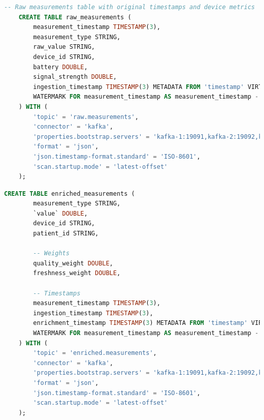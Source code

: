 \begin{lstlisting}[language=sql]
    -- Raw measurements table with original timestamps and device metrics
    CREATE TABLE raw_measurements (
        measurement_timestamp TIMESTAMP(3),
        measurement_type STRING,
        raw_value STRING,
        device_id STRING,
        battery DOUBLE,
        signal_strength DOUBLE,
        ingestion_timestamp TIMESTAMP(3) METADATA FROM 'timestamp' VIRTUAL,
        WATERMARK FOR measurement_timestamp AS measurement_timestamp - INTERVAL '10' SECONDS
    ) WITH (
        'topic' = 'raw.measurements',
        'connector' = 'kafka',
        'properties.bootstrap.servers' = 'kafka-1:19091,kafka-2:19092,kafka-3:19093',
        'format' = 'json',
        'json.timestamp-format.standard' = 'ISO-8601',
        'scan.startup.mode' = 'latest-offset'
    );
\end{lstlisting}
\newpage
\begin{lstlisting}[language=sql]
    CREATE TABLE enriched_measurements (
        measurement_type STRING,
        `value` DOUBLE,
        device_id STRING,
        patient_id STRING,
        
        -- Weights
        quality_weight DOUBLE,
        freshness_weight DOUBLE,
        
        -- Timestamps
        measurement_timestamp TIMESTAMP(3),
        ingestion_timestamp TIMESTAMP(3),
        enrichment_timestamp TIMESTAMP(3) METADATA FROM 'timestamp' VIRTUAL,
        WATERMARK FOR measurement_timestamp AS measurement_timestamp - INTERVAL '10' SECONDS
    ) WITH (
        'topic' = 'enriched.measurements',
        'connector' = 'kafka',
        'properties.bootstrap.servers' = 'kafka-1:19091,kafka-2:19092,kafka-3:19093',
        'format' = 'json',
        'json.timestamp-format.standard' = 'ISO-8601',
        'scan.startup.mode' = 'latest-offset'
    );
\end{lstlisting}
\newpage

